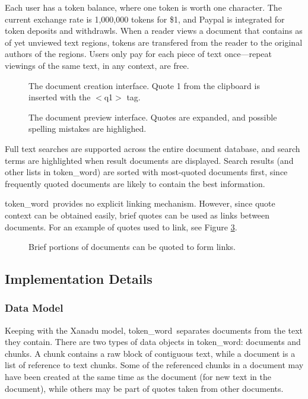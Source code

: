 \documentclass{acm_proc_article-sp}
\newcommand{\tw}{token\_word}
\begin{document}
Each user has a token balance, where one token is worth one character.
The current exchange rate is 1,000,000 tokens for \$1, and Paypal is integrated for token deposits and withdrawls.
When a reader views a document that contains as of yet unviewed text regions, tokens are transfered from the reader to the original authors of the regions.
Users only pay for each piece of text once---repeat viewings of the same text, in any context, are free.
\begin{figure}[t]
\centering
{}
\caption{The document creation interface. Quote 1 from the clipboard is inserted with the $<$q1$>$ tag.}
\label{fig:docCreate}
\end{figure}

\begin{figure}[t]
\centering
{}
\caption{The document preview interface.  Quotes are expanded, and possible spelling mistakes are highlighed.}
\label{fig:docPreview}
\end{figure}

Full text searches are supported across the entire document database, and search terms are highlighted when result documents are displayed.
Search results (and other lists in \tw) are sorted with most-quoted documents first, since frequently quoted documents are likely to contain the best information. 

\tw \ provides no explicit linking mechanism.
However, since quote context can be obtained easily, brief quotes can be used as links between documents.
For an example of quotes used to link, see Figure \ref{fig:quotesAsLinks}.

\begin{figure}[t]
\centering
{}
\caption{Brief portions of documents can be quoted to form links.}
\label{fig:quotesAsLinks}
\end{figure}

\subsection{Implementation Details}

\subsubsection{Data Model}
Keeping with the Xanadu model, \tw \ separates documents from the text they contain.
There are two types of data objects in \tw:  documents and chunks.
A chunk contains a raw block of contiguous text, while a document is a list of reference to text chunks.
Some of the referenced chunks in a document may have been created at the same time as the document (for new text in the document), while others may be part of quotes taken from other documents.
\end{document}
